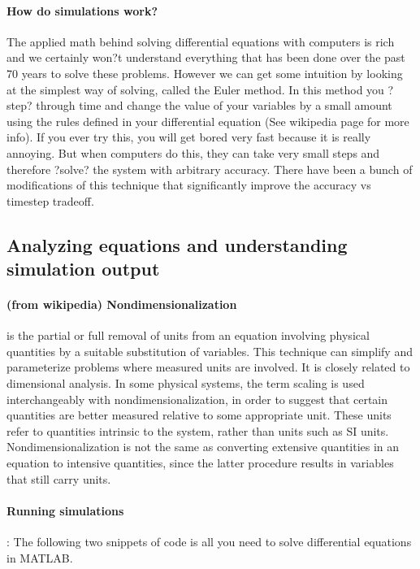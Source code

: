 \paragraph{How do simulations work?} The applied math behind solving differential equations with computers is rich and we certainly won?t understand everything that has been done over the past 70 years to solve these problems.  However we can get some intuition by looking at the simplest way of solving, called the Euler method.  In this method you ?step? through time and change the value of your variables by a small amount using the rules defined in your differential equation (See wikipedia page for more info).  If you ever try this, you will get bored very fast because it is really annoying.  But when computers do this, they can take very small steps and therefore ?solve? the system with arbitrary accuracy.  There have been a bunch of modifications of this technique that significantly improve the accuracy vs timestep tradeoff.






\subsection{Analyzing equations and understanding simulation output}

\paragraph{(from wikipedia) Nondimensionalization} is the partial or full removal of units from an equation involving physical quantities by a suitable substitution of variables. This technique can simplify and parameterize problems where measured units are involved. It is closely related to dimensional analysis. In some physical systems, the term scaling is used interchangeably with nondimensionalization, in order to suggest that certain quantities are better measured relative to some appropriate unit. These units refer to quantities intrinsic to the system, rather than units such as SI units. Nondimensionalization is not the same as converting extensive quantities in an equation to intensive quantities, since the latter procedure results in variables that still carry units.

\paragraph{Running simulations}: The following two snippets of code is all you need to solve differential equations in MATLAB.


